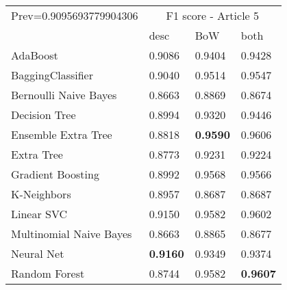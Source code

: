 \begin{tabular}{|l|l|l|l| }
\hline
Prev=0.9095693779904306 &  \multicolumn{3}{c|}{F1 score - Article 5} \\
\cline{2-4} & desc & BoW & both \\ \hline
AdaBoost                & 0.9086 & 0.9404 & 0.9428\\
BaggingClassifier       & 0.9040 & 0.9514 & 0.9547\\
Bernoulli Naive Bayes   & 0.8663 & 0.8869 & 0.8674\\
Decision Tree           & 0.8994 & 0.9320 & 0.9446\\
Ensemble Extra Tree     & 0.8818 & {\bf 0.9590} & 0.9606\\
Extra Tree              & 0.8773 & 0.9231 & 0.9224\\
Gradient Boosting       & 0.8992 & 0.9568 & 0.9566\\
K-Neighbors             & 0.8957 & 0.8687 & 0.8687\\
Linear SVC              & 0.9150 & 0.9582 & 0.9602\\
Multinomial Naive Bayes & 0.8663 & 0.8865 & 0.8677\\
Neural Net              & {\bf 0.9160} & 0.9349 & 0.9374\\
Random Forest           & 0.8744 & 0.9582 & {\bf 0.9607}\\
\hline
\end{tabular}